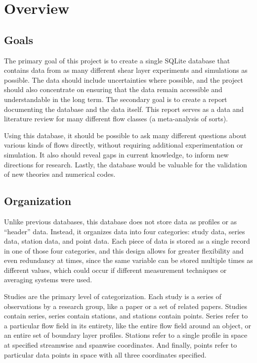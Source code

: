 %
\chapter{Overview}

\section{Goals}

The primary goal of this project is to create a single SQLite database that
contains data from as many different shear layer experiments and simulations as
possible.  The data should include uncertainties where possible, and the
project should also concentrate on ensuring that the data remain accessible and
understandable in the long term.  The secondary goal is to create a report
documenting the database and the data itself.  This report serves as a data and
literature review for many different flow classes (a meta-analysis of sorts).

Using this database, it should be possible to ask many different questions
about various kinds of flows directly, without requiring additional
experimentation or simulation.  It also should reveal gaps in current
knowledge, to inform new directions for research.  Lastly, the database would
be valuable for the validation of new theories and numerical codes.


\section{Organization}

Unlike previous databases, this database does not store data as profiles or as
``header'' data.  Instead, it organizes data into four categories: study data,
series data, station data, and point data.  Each piece of data is stored as a
single record in one of those four categories, and this design allows for
greater flexibility and even redundancy at times, since the same variable can
be stored multiple times as different values, which could occur if different
measurement techniques or averaging systems were used.

Studies are the primary level of categorization.  Each study is a series of
observations by a research group, like a paper or a set of related papers.
Studies contain series, series contain stations, and stations contain points.
Series refer to a particular flow field in its entirety, like the entire flow
field around an object, or an entire set of boundary layer profiles.  Stations
refer to a single profile in space at specified streamwise and spanwise
coordinates.  And finally, points refer to particular data points in space with
all three coordinates specified.

